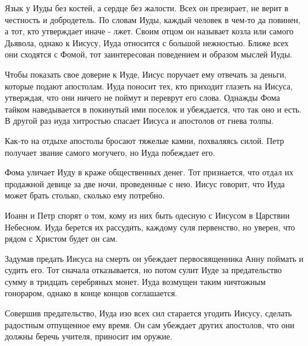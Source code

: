 \documentclass[a4paper,12pt]{article}
\begin{document}
	Язык у Иуды без костей, а сердце без жалости. Всех он презирает, не верит в честность и добродетель. По словам Иуды, каждый человек в чем-то да повинен, а тот, кто утверждает иначе - лжет. Своим отцом он называет козла или самого Дьявола, однако к Иисусу, Иуда относится с большой нежностью. Ближе всех они сходятся с Фомой, тот заинтересован поведением и образом мыслей Иуды.
	
	Чтобы показать свое доверие к Иуде, Иисус поручает ему отвечать за деньги, которые подают апостолам. Иуда поносит тех, кто приходит глазеть на Иисуса, утверждая, что они ничего не поймут и переврут его слова. Однажды Фома тайком наведывается в покинутый ими поселок и убеждается, что так оно и есть. В другой раз иуда хитростью спасает Иисуса и апостолов от гнева толпы.
	
	Как-то на отдыхе апостолы бросают тяжелые камни, похваляясь силой. Петр получает звание самого могучего, но Иуда побеждает его.
	
	Фома уличает Иуду в краже общественных денег. Тот признается, что отдал их продажной девице за две ночи, проведенные с нею. Иисус говорит, что Иуда может брать столько, сколько ему потребно.
	
	Иоанн и Петр спорят о том, кому из них быть одесную с Иисусом в Царствии Небесном. Иуда берется их рассудить, каждому суля первенство, но уверен, что рядом с Христом будет он сам.
	
	Задумав предать Иисуса на смерть он убеждает первосвященника Анну поймать и судить его. Тот сначала отказывается, но потом сулит Иуде за предательство сумму в тридцать серебряных монет. Иуда возмущен таким ничтожным гонораром, однако в конце концов соглашается.
	
	Совершив предательство, Иуда изо всех сил старается угодить Иисусу, сделать радостным отпущенное ему время. Он сам убеждает других апостолов, что они должны беречь учителя, приносит им оружие.
	
	
\end{document}
